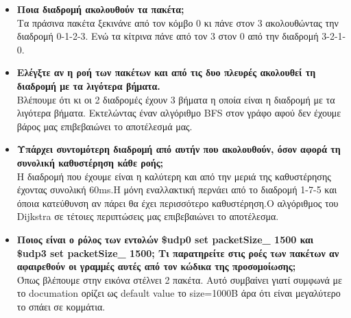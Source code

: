 \documentclass{article}
\begin{document}
\begin{itemize}
\item \textbf{Ποια διαδρομή ακολουθούν τα πακέτα;}\\
Τα πράσινα πακέτα ξεκινάνε από τον κόμβο 0 κι πάνε στον 3 ακολουθώντας την διαδρομή 0-1-2-3. Ενώ τα κίτρινα πάνε από τον 3 στον 0 από την διαδρομή 3-2-1-0.
\item
\textbf{Ελέγξτε αν η ροή των πακέτων και από τις δυο πλευρές ακολουθεί τη διαδρομή με τα λιγότερα βήματα.}\\
Βλέπουμε ότι κι οι 2 διαδρομές έχουν 3 βήματα η οποία είναι η διαδρομή με τα λιγότερα βήματα. Εκτελώντας έναν αλγόριθμο BFS στον γράφο αφού δεν έχουμε βάρος μας επιβεβαιώνει το αποτέλεσμά μας.
\item
\textbf{Υπάρχει συντομότερη διαδρομή από αυτήν που ακολουθούν, όσον αφορά τη συνολική καθυστέρηση κάθε ροής; }\\
Η διαδρομή που έχουμε είναι η καλύτερη και από την μεριά της καθυστέρησης έχοντας συνολική 60ms.Η μόνη εναλλακτική  περνάει από το  διαδρομή 1-7-5 και όποια κατεύθυνση αν πάρει θα έχει περισσότερο καθυστέρηση.Ο αλγόριθμος του Dijkstra  σε τέτοιες περιπτώσεις μας επιβεβαιώνει το αποτέλεσμα.
\item
\textbf{Ποιος είναι ο ρόλος των εντολών \$udp0 set packetSize\_ 1500 και \$udp3 set packetSize\_ 1500; Τι παρατηρείτε στις ροές των πακέτων αν αφαιρεθούν οι γραμμές
	αυτές από τον κώδικα της προσομοίωσης; }\\
Όπως βλέπουμε στην εικόνα στέλνει 2 πακέτα. Αυτό συμβαίνει γιατί συμφωνά με το documation ορίζει ως default value το size=1000Β  άρα ότι είναι μεγαλύτερο το σπάει σε κομμάτια. 

\end{itemize}
\end{document}
